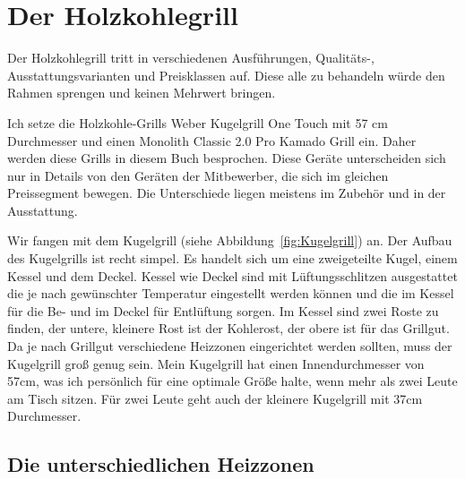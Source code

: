 
\section{Der Holzkohlegrill}

	Der Holzkohlegrill tritt in verschiedenen Ausführungen, Qualitäts-, 
	Ausstattungsvarianten und Preisklassen auf. 
	Diese alle zu behandeln würde den Rahmen sprengen und keinen Mehrwert 
	bringen.
	
	Ich setze die Holzkohle-Grills Weber Kugelgrill One Touch mit 57 cm 
	Durchmesser und einen Monolith Classic 2.0
	Pro Kamado Grill ein. Daher werden diese Grills in diesem Buch besprochen.
	Diese Geräte unterscheiden sich nur in Details von den Geräten der 
	Mitbewerber, die sich im gleichen Preissegment
	bewegen.  Die Unterschiede liegen meistens im Zubehör und in der 
	Ausstattung.
	
	Wir fangen mit dem Kugelgrill (siehe Abbildung~\vref{fig:Kugelgrill}) an. Der Aufbau des Kugelgrills ist recht simpel. 
	Es handelt sich um eine zweigeteilte
	Kugel, einem Kessel und dem Deckel. Kessel wie Deckel sind mit 
	Lüftungsschlitzen ausgestattet die je 
	nach gewünschter Temperatur eingestellt werden können und die im  Kessel 
	für die Be- und im Deckel für 
	Entlüftung sorgen. Im Kessel sind zwei Roste zu finden, der untere, kleinere 
	Rost ist der Kohlerost, der 
	obere ist für das Grillgut. Da je nach Grillgut verschiedene Heizzonen 
	eingerichtet werden sollten, muss der
	Kugelgrill groß genug sein. Mein Kugelgrill hat einen Innendurchmesser von 
	57cm, was ich persönlich für 
	eine optimale Größe halte, wenn mehr als zwei Leute am Tisch sitzen. Für zwei 
	Leute geht auch der kleinere 
	Kugelgrill mit 37cm Durchmesser.

\subsection{Die unterschiedlichen Heizzonen} \label{Heizzonen}
	
